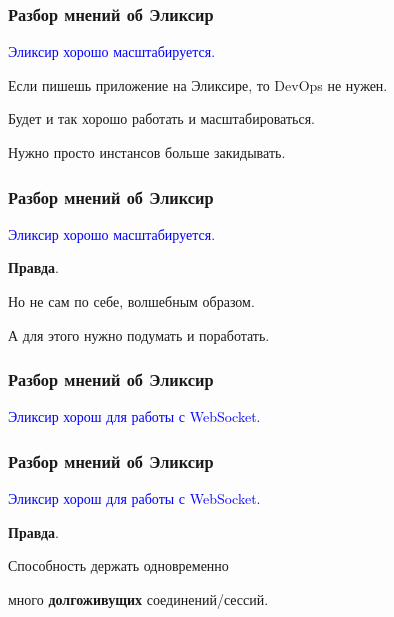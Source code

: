 \documentclass[10pt]{beamer}
\begin{document}

\begin{frame}
\frametitle{Разбор мнений об Эликсир}
\centering
\textcolor{blue}{Эликсир хорошо масштабируется.}
\par \bigskip
Если пишешь приложение на Эликсире, то DevOps не нужен.
\par
Будет и так хорошо работать и масштабироваться.
\par
Нужно просто инстансов больше закидывать.
\end{frame}

\begin{frame}
\frametitle{Разбор мнений об Эликсир}
\centering
\textcolor{blue}{Эликсир хорошо масштабируется.}
\par \bigskip
\textbf{Правда}.
\par \bigskip
Но не сам по себе, волшебным образом.
\par
А для этого нужно подумать и поработать.
\end{frame}




\begin{frame}
\frametitle{Разбор мнений об Эликсир}
\centering
\textcolor{blue}{Эликсир хорош для работы с WebSocket.}
\end{frame}

\begin{frame}
\frametitle{Разбор мнений об Эликсир}
\centering
\textcolor{blue}{Эликсир хорош для работы с WebSocket.}
\par \bigskip
\textbf{Правда}.
\par \bigskip
Способность держать одновременно
\par
много \textbf{долгоживущих} соединений/сессий.
\end{frame}
\end{document}
